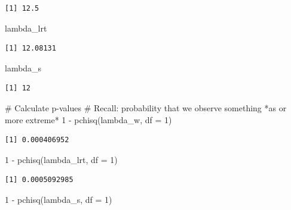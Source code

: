 \documentclass[
  letterpaper,
  DIV=11,
  numbers=noendperiod]{scrreprt}
\newenvironment{Shaded}{\begin{snugshade}}{\end{snugshade}}
\newcommand{\AttributeTok}[1]{\textcolor[rgb]{0.40,0.45,0.13}{#1}}
\newcommand{\CommentTok}[1]{\textcolor[rgb]{0.37,0.37,0.37}{#1}}
\newcommand{\DecValTok}[1]{\textcolor[rgb]{0.68,0.00,0.00}{#1}}
\newcommand{\FunctionTok}[1]{\textcolor[rgb]{0.28,0.35,0.67}{#1}}
\newcommand{\NormalTok}[1]{\textcolor[rgb]{0.00,0.23,0.31}{#1}}
\newcommand{\SpecialCharTok}[1]{\textcolor[rgb]{0.37,0.37,0.37}{#1}}
\begin{document}
\begin{verbatim}
[1] 12.5
\end{verbatim}

\begin{Shaded}
\begin{Highlighting}[]
\NormalTok{lambda\_lrt}
\end{Highlighting}
\end{Shaded}

\begin{verbatim}
[1] 12.08131
\end{verbatim}

\begin{Shaded}
\begin{Highlighting}[]
\NormalTok{lambda\_s}
\end{Highlighting}
\end{Shaded}

\begin{verbatim}
[1] 12
\end{verbatim}

\begin{Shaded}
\begin{Highlighting}[]
\CommentTok{\# Calculate p{-}values}
\CommentTok{\# Recall: probability that we observe something *as or more extreme*}
\DecValTok{1} \SpecialCharTok{{-}} \FunctionTok{pchisq}\NormalTok{(lambda\_w, }\AttributeTok{df =} \DecValTok{1}\NormalTok{)}
\end{Highlighting}
\end{Shaded}

\begin{verbatim}
[1] 0.000406952
\end{verbatim}

\begin{Shaded}
\begin{Highlighting}[]
\DecValTok{1} \SpecialCharTok{{-}} \FunctionTok{pchisq}\NormalTok{(lambda\_lrt, }\AttributeTok{df =} \DecValTok{1}\NormalTok{)}
\end{Highlighting}
\end{Shaded}

\begin{verbatim}
[1] 0.0005092985
\end{verbatim}

\begin{Shaded}
\begin{Highlighting}[]
\DecValTok{1} \SpecialCharTok{{-}} \FunctionTok{pchisq}\NormalTok{(lambda\_s, }\AttributeTok{df =} \DecValTok{1}\NormalTok{)}
\end{Highlighting}
\end{Shaded}
\end{document}
